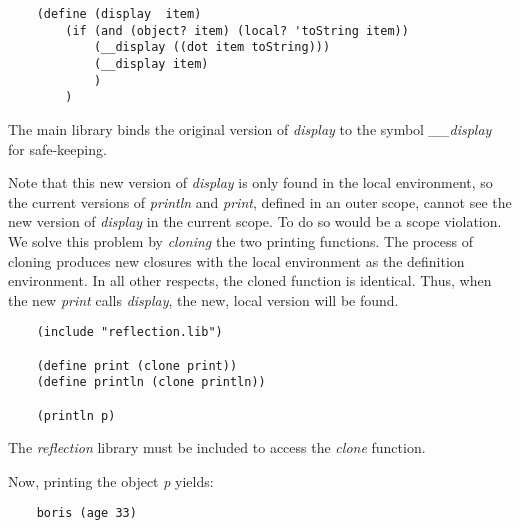 \begin{verbatim}
    (define (display  item)
        (if (and (object? item) (local? 'toString item))
            (__display ((dot item toString)))
            (__display item)
            )
        )
\end{verbatim}

The main library binds the original version of {\it display}
to the symbol {\it \_\_display} for
safe-keeping.

Note that this new version of {\it display} is only found in the local
environment, so the current versions of {\it println} and {\it print}, defined
in an outer scope, cannot see the new version of {\it display} in the current
scope.
To do so would be a scope violation.
We solve this problem by {\it cloning} the two printing functions.
The process of cloning produces new closures with 
the local environment as the definition environment.
In all other respects, the cloned function is identical.
Thus, when the new {\it print} calls {\it display}, the new, local version 
will be found.

\begin{verbatim}
    (include "reflection.lib")

    (define print (clone print))
    (define println (clone println))

    (println p)
\end{verbatim}

The {\it reflection} library must be included
to access the {\it clone} function.

Now, printing the object {\it p} yields:

\begin{verbatim}
    boris (age 33)
\end{verbatim}
